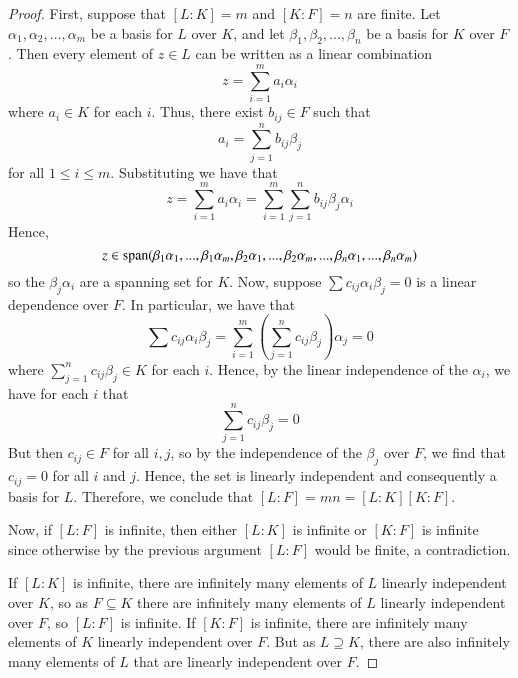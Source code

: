 \begin{proof}
    First, suppose that $[L:K] = m$ and $[K:F] = n$ are finite. Let $\alpha_1,\alpha_2,...,\alpha_m$ be a basis for $L$ over $K$, and let $\beta_1,\beta_2,...,\beta_n$ be a basis for $K$ over $F$. Then every element of $z \in L$ can be written as a linear combination \begin{equation*}
        z = \sum_{i=1}^ma_i\alpha_i
    \end{equation*}
    where $a_i \in K$ for each $i$. Thus, there exist $b_{ij} \in F$ such that \begin{equation*}
        a_i = \sum_{j=1}^nb_{ij}\beta_j
    \end{equation*}
    for all $1 \leq i \leq m$. Substituting we have that \begin{equation*}
        z = \sum_{i=1}^ma_i\alpha_i = \sum_{i=1}^m\sum_{j=1}^nb_{ij}\beta_j\alpha_i
    \end{equation*}
    Hence, $$z \in \operatorname{span}(\beta_1\alpha_1,...,\beta_1\alpha_m,\beta_2\alpha_1,...,\beta_2\alpha_m,...,\beta_n\alpha_1,...,\beta_n\alpha_m)$$
    so the $\beta_j\alpha_i$ are a spanning set for $K$. Now, suppose $\sum c_{ij}\alpha_i\beta_j = 0$ is a linear dependence over $F$. In particular, we have that \begin{equation*}
        \sum c_{ij}\alpha_i\beta_j = \sum_{i=1}^m\left(\sum_{j=1}^nc_{ij}\beta_j\right)\alpha_j = 0
    \end{equation*}
    where $\sum_{j=1}^nc_{ij}\beta_j \in K$ for each $i$. Hence, by the linear independence of the $\alpha_i$, we have for each $i$ that \begin{equation*}
        \sum_{j=1}^nc_{ij}\beta_j = 0
    \end{equation*}
    But then $c_{ij} \in F$ for all $i,j$, so by the independence of the $\beta_j$ over $F$, we find that $c_{ij} = 0$ for all $i$ and $j$. Hence, the set is linearly independent and consequently a basis for $L$. Therefore, we conclude that $[L:F] = mn = [L:K][K:F]$.


    Now, if $[L:F]$ is infinite, then either $[L:K]$ is infinite or $[K:F]$ is infinite since otherwise by the previous argument $[L:F]$ would be finite, a contradiction.

    If $[L:K]$ is infinite, there are infinitely many elements of $L$ linearly independent over $K$, so as $F \subseteq K$ there are infinitely many elements of $L$ linearly independent over $F$, so $[L:F]$ is infinite. If $[K:F]$ is infinite, there are infinitely many elements of $K$ linearly independent over $F$. But as $L \supseteq K$, there are also infinitely many elements of $L$ that are linearly independent over $F$.
\end{proof}



